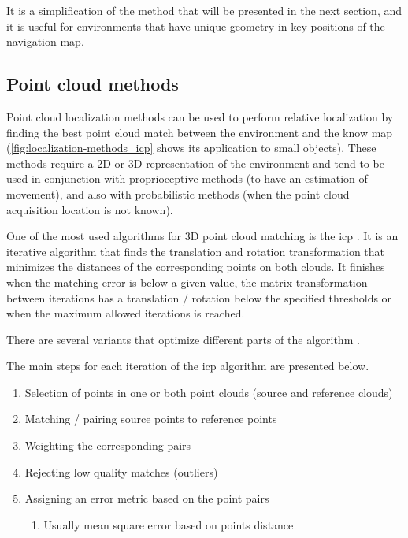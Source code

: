 It is a simplification of the method that will be presented in the next section, and it is useful for environments that have unique geometry in key positions of the navigation map.


\subsection{Point cloud methods}\label{subsec:localization-methods_point-cloud-methods}

Point cloud localization methods can be used to perform relative localization by finding the best point cloud match between the environment and the know map (\cref{fig:localization-methods_icp} shows its application to small objects). These methods require a 2D or 3D representation of the environment and tend to be used in conjunction with proprioceptive methods (to have an estimation of movement), and also with probabilistic methods (when the point cloud acquisition location is not known).

One of the most used algorithms for 3D point cloud matching is the \gls{icp} \cite{Besl1992,Jez2008,Zhang1992,Bouaziz2013,Chetverikov2002,Djehaich2013,Zhou2011}. It is an iterative algorithm that finds the translation and rotation transformation that minimizes the distances of the corresponding points on both clouds. It finishes when the matching error is below a given value, the matrix transformation between iterations has a translation / rotation below the specified thresholds or when the maximum allowed iterations is reached.

There are several variants that optimize different parts of the algorithm \cite{Rusinkiewicz2001}.

The main steps for each iteration of the \gls{icp} algorithm are presented below.

\begin{enumerate}
	\item  Selection of points in one or both point clouds (source and reference clouds)
	\item  Matching / pairing source points to reference points
	\item  Weighting the corresponding pairs
	\item  Rejecting low quality matches (outliers)
	\item  Assigning an error metric based on the point pairs
	\begin{enumerate}
		\item  Usually mean square error based on points distance
	\end{enumerate}
\end{enumerate}


